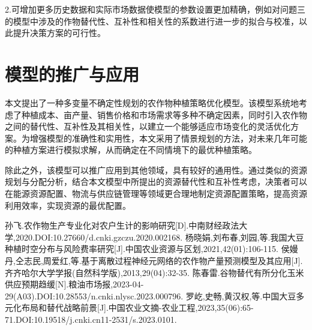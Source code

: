 \documentclass{cumcmthesis}
\begin{document}
2.可增加更多历史数据和实际市场数据使模型的参数设置更加精确，例如对问题三的模型中涉及的作物替代性、互补性和相关性的系数进行进一步的拟合与校准，以此提升决策方案的可行性。

\section{模型的推广与应用}
本文提出了一种多变量不确定性规划的农作物种植策略优化模型。该模型系统地考虑了种植成本、亩产量、销售价格和市场需求等多种不确定因素，同时引入农作物之间的替代性、互补性及其相关性，以建立一个能够适应市场变化的灵活优化方案。为增强模型的准确性和实用性，本文采用了情景规划的方法，对未来几年可能的种植方案进行模拟求解，从而确定在不同情境下的最优种植策略。

除此之外，该模型可以推广应用到其他领域，具有较好的通用性。通过类似的资源规划与分配分析，结合本文模型中所提出的资源替代性和互补性考虑，决策者可以在能源资源配置、物流与供应链管理等领域更合理地制定资源配置策略，提高资源利用效率，实现资源的最优配置。

\begin{thebibliography}{99}  
 孙飞.农作物生产专业化对农户生计的影响研究[D].中南财经政法大学,2020.DOI:10.27660/d.cnki.gzczu.2020.002168.
 杨晓娟,刘布春,刘园,等.我国大豆种植时空分布与风险费率研究[J].中国农业资源与区划,2021,42(01):106-115.
 侯嫚丹,仝志民,周爱红,等.基于离散过程神经元网络的农作物产量预测模型及其应用[J].齐齐哈尔大学学报(自然科学版),2013,29(04):32-35.
 陈春雷.谷物替代有所分化玉米供应预期趋缓[N].粮油市场报,2023-04-29(A03).DOI:10.28553/n.cnki.nlysc.2023.000796.
 罗屹,史畅,黄汉权,等.中国大豆多元化布局和替代战略前景[J].中国农业文摘-农业工程,2023,35(06):65-71.DOI:10.19518/j.cnki.cn11-2531/s.2023.0101.



\end{thebibliography}
    
\end{document}
